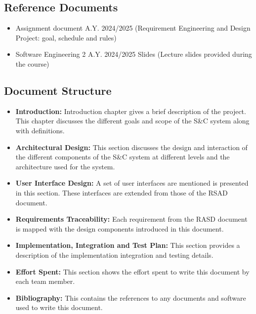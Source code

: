\subsection{Reference Documents}
\begin{itemize}
    \item Assignment document A.Y. 2024/2025
\newline (Requirement Engineering and Design Project: goal, schedule and rules)
\item Software Engineering 2 A.Y. 2024/2025 Slides
\newline (Lecture slides provided during the course)
\end{itemize}

\subsection{Document Structure}
\begin{itemize}
\item \textbf{Introduction:} Introduction chapter gives a brief description of the project. This chapter discusses the different goals and scope of the S\&C system along with definitions.
\item \textbf{Architectural Design:} This section discusses the design and interaction of the different components of the S\&C system at different levels and the architecture used for the system.
\item \textbf{User Interface Design: } A set of user interfaces are mentioned is presented in this section. These interfaces are extended from those of the RSAD document.
\item \textbf{Requirements Traceability: } Each requirement from the RASD document is mapped with the design components introduced in this document.
\item \textbf{Implementation, Integration and Test Plan: } This section provides a description of the implementation integration and testing details.
\item \textbf{Effort Spent: } This section shows the effort spent to write this document by each team member.
\item \textbf{Bibliography:} This contains the references to any documents and software used to write this document.
\end{itemize}